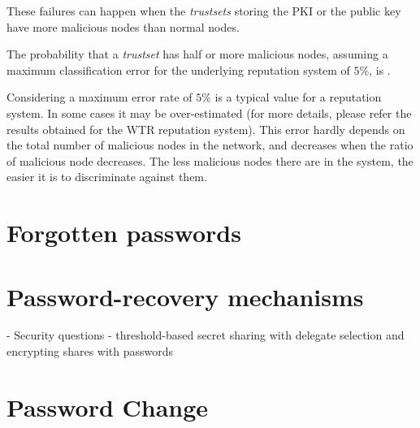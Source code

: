 These failures can happen when the \textit{trustsets} storing the PKI or the public
key have more malicious nodes than normal nodes.

The probability that a \textit{trustset} has half or more malicious nodes, assuming a maximum
classification error for the underlying reputation system
of $5\%$, is .%

Considering a maximum error rate of $5\%$ is a typical
value for a reputation system. In some cases it may be
over-estimated (for more details, please refer the results
obtained for the WTR reputation system\cite{wrt_reputation_system}). This
error hardly depends on the total number of malicious
nodes in the network, and decreases when the ratio
of malicious node decreases. The less malicious nodes
there are in the system, the easier it is to discriminate
against them.



\section{Forgotten passwords}

\section{Password-recovery mechanisms}
  - Security questions
  - threshold-based secret sharing with delegate selection and encrypting
  shares with passwords

\section{Password Change}


